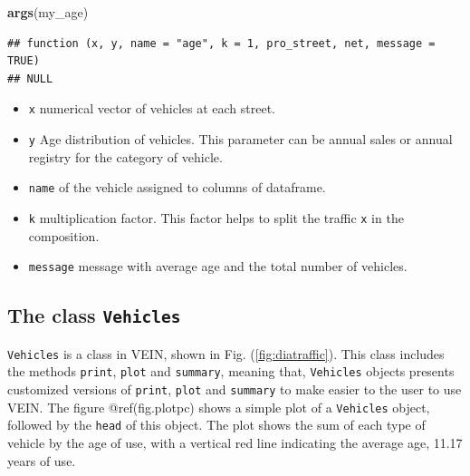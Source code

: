 \documentclass[12pt,graybox,envcountchap,sectrefs]{krantz}
\makeatletter
\newenvironment{Shaded}{\begin{snugshade}}{\end{snugshade}}
\newcommand{\KeywordTok}[1]{\textcolor[rgb]{0.13,0.29,0.53}{\textbf{#1}}}
\newcommand{\DataTypeTok}[1]{\textcolor[rgb]{0.13,0.29,0.53}{#1}}
\newcommand{\DecValTok}[1]{\textcolor[rgb]{0.00,0.00,0.81}{#1}}
\newcommand{\FloatTok}[1]{\textcolor[rgb]{0.00,0.00,0.81}{#1}}
\newcommand{\StringTok}[1]{\textcolor[rgb]{0.31,0.60,0.02}{#1}}
\newcommand{\OperatorTok}[1]{\textcolor[rgb]{0.81,0.36,0.00}{\textbf{#1}}}
\newcommand{\NormalTok}[1]{#1}
\providecommand{\tightlist}{%
  \setlength{\itemsep}{0pt}\setlength{\parskip}{0pt}}
\newenvironment{kframe}{%
\medskip{}
\setlength{\fboxsep}{.8em}
 \def\at@end@of@kframe{}%
 \ifinner\ifhmode%
  \def\at@end@of@kframe{\end{minipage}}%
  \begin{minipage}{\columnwidth}%
 \fi\fi%
 \def\FrameCommand##1{\hskip\@totalleftmargin \hskip-\fboxsep
 \colorbox{shadecolor}{##1}\hskip-\fboxsep
     \hskip-\linewidth \hskip-\@totalleftmargin \hskip\columnwidth}%
 \MakeFramed {\advance\hsize-\width
   \@totalleftmargin\z@ \linewidth\hsize
   \@setminipage}}%
 {\par\unskip\endMakeFramed%
 \at@end@of@kframe}
\renewenvironment{Shaded}{\begin{kframe}}{\end{kframe}}
\theoremstyle{definition}
\theoremstyle{definition}
\theoremstyle{definition}
\theoremstyle{remark}
\makeatother
\begin{document}
\begin{Shaded}
\begin{Highlighting}[]
\KeywordTok{args}\NormalTok{(my_age)}
\end{Highlighting}
\end{Shaded}

\begin{verbatim}
## function (x, y, name = "age", k = 1, pro_street, net, message = TRUE) 
## NULL
\end{verbatim}

\begin{itemize}
\tightlist
\item
  \texttt{x} numerical vector of vehicles at each street.
\item
  \texttt{y} Age distribution of vehicles. This parameter can be annual
  sales or annual registry for the category of vehicle.
\item
  \texttt{name} of the vehicle assigned to columns of dataframe.
\item
  \texttt{k} multiplication factor. This factor helps to split the
  traffic \texttt{x} in the composition.
\item
  \texttt{message} message with average age and the total number of
  vehicles.
\end{itemize}

\subsection{\texorpdfstring{The class
\texttt{Vehicles}}{The class Vehicles}}\label{the-class-vehicles}

\texttt{Vehicles} is a class in VEIN, shown in Fig.
(\ref{fig:diatraffic}). This class includes the methods \texttt{print},
\texttt{plot} and \texttt{summary}, meaning that, \texttt{Vehicles}
objects presents customized versions of \texttt{print}, \texttt{plot}
and \texttt{summary} to make easier to the user to use VEIN. The figure
@ref(fig.plotpc) shows a simple plot of a \texttt{Vehicles} object,
followed by the \texttt{head} of this object. The plot shows the sum of
each type of vehicle by the age of use, with a vertical red line
indicating the average age, 11.17 years of use.

\begin{Shaded}
\end{Shaded}
\end{document}

